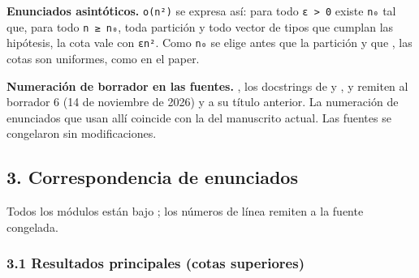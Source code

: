 \documentclass[spanish,11pt,a4paper]{article}
\begin{document}
\textbf{Enunciados asintóticos.} \texttt{o(n²)} se expresa así: para todo \texttt{ε\ \textgreater{}\ 0} existe \texttt{n₀} tal que, para todo \texttt{n\ ≥\ n₀}, toda partición y todo vector de tipos que cumplan las hipótesis, la cota vale con \texttt{εn²}. Como \texttt{n₀} se elige antes que la partición y que , las cotas son uniformes, como en el paper.

\textbf{Numeración de borrador en las fuentes.} , los docstrings de  y , y  remiten al borrador 6 (14 de noviembre de 2026) y a su título anterior. La numeración de enunciados que usan allí coincide con la del manuscrito actual. Las fuentes se congelaron sin modificaciones.

\subsection{3. Correspondencia de enunciados}\label{correspondencia-de-enunciados}

Todos los módulos están bajo ; los números de línea remiten a la fuente congelada.

\subsubsection{3.1 Resultados principales (cotas superiores)}\label{resultados-principales-cotas-superiores}
\end{document}

